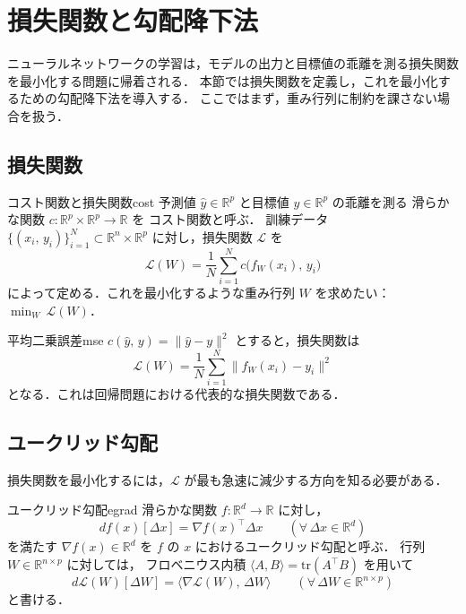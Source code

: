 \documentclass[uplatex, dvipdfmx]{jsarticle}
\begin{document}
\section{損失関数と勾配降下法}

ニューラルネットワークの学習は，モデルの出力と目標値の乖離を測る損失関数を最小化する問題に帰着される．
本節では損失関数を定義し，これを最小化するための勾配降下法を導入する．
ここではまず，重み行列に制約を課さない場合を扱う．

\subsection{損失関数}

\begin{definition}{コスト関数と損失関数}{cost}
予測値 $\hat{y}\in\mathbb{R}^{p}$ と目標値 $y\in\mathbb{R}^{p}$ の乖離を測る
滑らかな関数 $c\colon\mathbb{R}^{p}\times\mathbb{R}^{p}\to\mathbb{R}$ を
コスト関数と呼ぶ．
訓練データ $\{(x_i,\, y_i)\}_{i=1}^{N}\subset\mathbb{R}^{n}\times\mathbb{R}^{p}$
に対し，損失関数 $\mathcal{L}$ を
\[
\mathcal{L}(W) = \frac{1}{N}\sum_{i=1}^{N} c\bigl(f_W(x_i),\, y_i\bigr)
\]
によって定める．これを最小化するような重み行列 $W$ を求めたい：
$\displaystyle\min_{W}\, \mathcal{L}(W)$．
\end{definition}

\begin{example}{平均二乗誤差}{mse}
$c(\hat{y},\,y)=\|\hat{y}-y\|^2$ とすると，損失関数は
\[
\mathcal{L}(W) = \frac{1}{N}\sum_{i=1}^{N}\bigl\|f_W(x_i)-y_i\bigr\|^2
\]
となる．これは回帰問題における代表的な損失関数である．
\end{example}

\subsection{ユークリッド勾配}

損失関数を最小化するには，$\mathcal{L}$ が最も急速に減少する方向を知る必要がある．

\begin{definition}{ユークリッド勾配}{egrad}
滑らかな関数 $f\colon\mathbb{R}^{d}\to\mathbb{R}$ に対し，
\[
df(x)[\Delta x] = \nabla f(x)^\top \Delta x
\qquad (\forall\, \Delta x\in\mathbb{R}^{d})
\]
を満たす $\nabla f(x)\in\mathbb{R}^{d}$ を
$f$ の $x$ におけるユークリッド勾配と呼ぶ．
行列 $W\in\mathbb{R}^{n\times p}$ に対しては，
フロベニウス内積 $\langle A,B\rangle=\mathrm{tr}(A^\top B)$ を用いて
\[
d\mathcal{L}(W)[\Delta W] = \langle \nabla \mathcal{L}(W),\, \Delta W \rangle
\qquad (\forall\, \Delta W\in\mathbb{R}^{n\times p})
\]
と書ける．
\end{definition}
\end{document}
